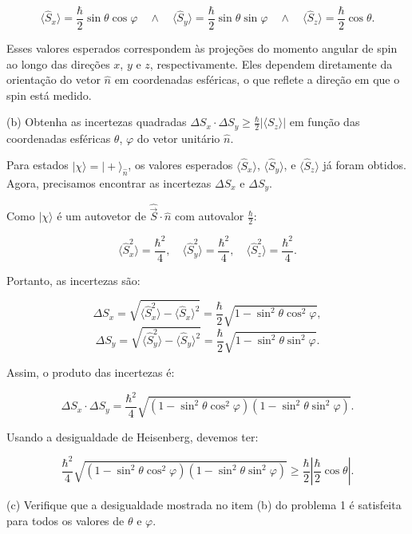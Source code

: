 \documentclass[12pt]{article}
\begin{document}
\begin{enumerate}
\begin{equation}
\langle \hat{S}_x \rangle = \frac{\hbar}{2} \sin\theta \cos\varphi \quad \wedge \quad  
\langle \hat{S}_y \rangle = \frac{\hbar}{2} \sin\theta \sin\varphi \quad \wedge  \quad
\langle \hat{S}_z \rangle = \frac{\hbar}{2} \cos\theta.
\end{equation}

Esses valores esperados correspondem às projeções do momento angular de spin ao longo das direções \(x\), \(y\) e \(z\), respectivamente. Eles dependem diretamente da orientação do vetor \(\hat{n}\) em coordenadas esféricas, o que reflete a direção em que o spin está medido.

(b) Obtenha as incertezas quadradas $\Delta S_x \cdot \Delta S_y \geq \frac{\hbar}{2} |\langle S_z \rangle|$ em função das coordenadas esféricas $\theta$, $\varphi$ do vetor unitário $\hat{n}$.

Para estados \(|\chi\rangle = |+\rangle_{\hat{n}}\), os valores esperados \(\langle \hat{S}_x \rangle\), \(\langle \hat{S}_y \rangle\), e \(\langle \hat{S}_z \rangle\) já foram obtidos. Agora, precisamos encontrar as incertezas \( \Delta S_x \) e \( \Delta S_y \).

Como \(|\chi\rangle\) é um autovetor de \(\hat{\vec{S}} \cdot \hat{n}\) com autovalor \(\frac{\hbar}{2}\):

\[
\langle \hat{S}_x^2 \rangle = \frac{\hbar^2}{4}, \quad \langle \hat{S}_y^2 \rangle = \frac{\hbar^2}{4}, \quad \langle \hat{S}_z^2 \rangle = \frac{\hbar^2}{4}.
\]

Portanto, as incertezas são:

\[
\Delta S_x = \sqrt{\langle \hat{S}_x^2 \rangle - \langle \hat{S}_x \rangle^2} = \frac{\hbar}{2} \sqrt{1 - \sin^2\theta \cos^2\varphi},
\]
\[
\Delta S_y = \sqrt{\langle \hat{S}_y^2 \rangle - \langle \hat{S}_y \rangle^2} = \frac{\hbar}{2} \sqrt{1 - \sin^2\theta \sin^2\varphi}.
\]

Assim, o produto das incertezas é:

\[
\Delta S_x \cdot \Delta S_y = \frac{\hbar^2}{4} \sqrt{(1 - \sin^2\theta \cos^2\varphi)(1 - \sin^2\theta \sin^2\varphi)}.
\]

Usando a desigualdade de Heisenberg, devemos ter:

\[
\frac{\hbar^2}{4} \sqrt{(1 - \sin^2\theta \cos^2\varphi)(1 - \sin^2\theta \sin^2\varphi)} \geq \frac{\hbar}{2} \left|\frac{\hbar}{2} \cos\theta \right|.
\]

(c) Verifique que a desigualdade mostrada no item (b) do problema 1 é satisfeita para todos os valores de $\theta$ e $\varphi$.


\end{enumerate}
\end{document}
